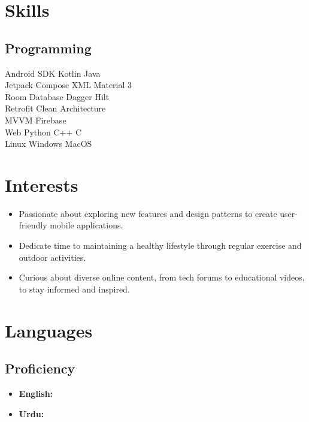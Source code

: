 \documentclass[bold]{deedy-resume-openfont}
\begin{document}
\begin{minipage}[t]{0.33\textwidth}
\section{Skills}
\subsection{Programming}
Android SDK \textbullet{} Kotlin \textbullet{} Java \\
Jetpack Compose \textbullet{} XML \textbullet{} Material 3  \\
Room Database \textbullet{} Dagger Hilt \\ 
Retrofit \textbullet{} Clean Architecture \\ 
MVVM \textbullet{} Firebase  \\
Web \textbullet{} Python \textbullet{} C++ \textbullet{} C \\
Linux \textbullet{} Windows \textbullet{} MacOS
\sectionsep


\section*{Interests}
\begin{itemize}[leftmargin=0pt]
    \item {} Passionate about exploring new features and design patterns to create user-friendly mobile applications.
    \item {} Dedicate time to maintaining a healthy lifestyle through regular exercise and outdoor activities.
    \item {} Curious about diverse online content, from tech forums to educational videos, to stay informed and inspired.
\end{itemize}


\section{Languages}
\subsection{Proficiency}
\begin{itemize}[label=\textbullet, leftmargin=*, topsep=5pt, itemsep=-1ex]
    \item \textbf{English:} 
    \item \textbf{Urdu:} 
\end{itemize}
\sectionsep


%
%

\end{minipage} 
\end{document}
